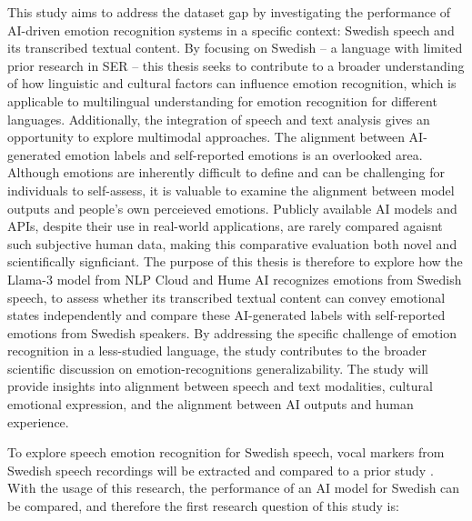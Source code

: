 \medskip
This study aims to address the dataset gap by investigating the performance of AI-driven emotion recognition systems in a specific context: Swedish speech and its transcribed textual content. By focusing on Swedish – a language with limited prior research in SER – this thesis seeks to contribute to a broader understanding of how linguistic and cultural factors can influence emotion recognition, which is applicable to multilingual understanding for emotion recognition for different languages. Additionally, the integration of speech and text analysis gives an opportunity to explore multimodal approaches. The alignment between AI-generated emotion labels and self-reported emotions is an overlooked area. 
Although emotions are inherently difficult to define and can be challenging for individuals to self-assess, it is valuable to examine the alignment between model outputs and people’s own perceieved emotions. Publicly available AI models and APIs, despite their use in real-world applications, are rarely compared agaisnt such subjective human data, making this comparative evaluation both novel and scientifically signficiant. 
The purpose of this thesis is therefore to explore how the Llama-3 model from NLP Cloud and Hume AI recognizes emotions from Swedish speech, to assess whether its transcribed textual content can convey emotional states independently and compare these AI-generated labels with self-reported emotions from Swedish speakers. By addressing the specific challenge of emotion recognition in a less-studied language, the study contributes to the broader scientific discussion on emotion-recognitions generalizability. The study will provide insights into alignment between speech and text modalities, cultural emotional expression, and the alignment between AI outputs and human experience.  

\medskip
To explore speech emotion recognition for Swedish speech, vocal markers from Swedish speech recordings will be extracted and compared to a prior study \autocite{Ekberg2023}. With the usage of this research, the performance of an AI model for Swedish can be compared, and therefore the first research question of this study is: 

